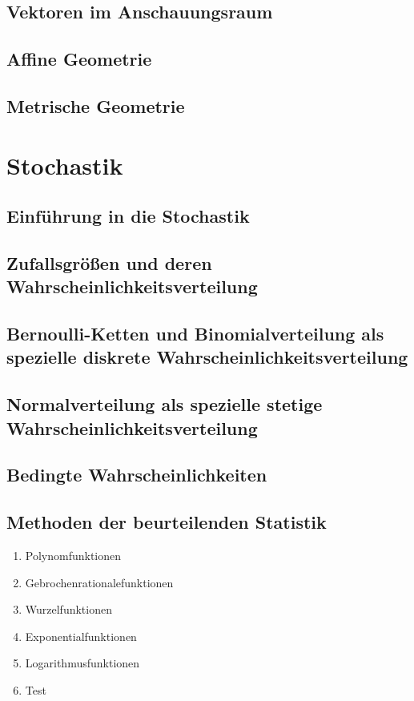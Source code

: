 \documentclass{article}
\begin{document}
	\subsection{Vektoren im Anschauungsraum}
	\subsection{Affine Geometrie}
	\subsection{Metrische Geometrie}

\section{Stochastik}
	\subsection{Einführung in die Stochastik}
	\subsection{Zufallsgrößen und deren Wahrscheinlichkeitsverteilung}
	\subsection{Bernoulli-Ketten und Binomialverteilung als spezielle diskrete Wahrscheinlichkeitsverteilung}
	\subsection{Normalverteilung als spezielle stetige Wahrscheinlichkeitsverteilung}
	\subsection{Bedingte Wahrscheinlichkeiten}
	\subsection{Methoden der beurteilenden Statistik}


\begin{enumerate}
    \item Polynomfunktionen
    \item Gebrochenrationalefunktionen
    \item Wurzelfunktionen
    \item Exponentialfunktionen
    \item Logarithmusfunktionen
    \item Test
\end{enumerate}
\end{document}
